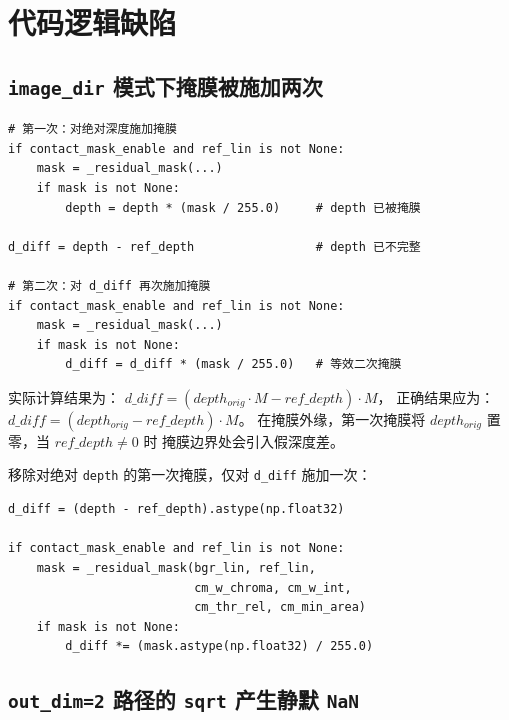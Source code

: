 \section{代码逻辑缺陷}
\label{sec:bugs}

\subsection{\texttt{image\_dir} 模式下掩膜被施加两次}
\label{subsec:double_mask}

\begin{lstlisting}[caption={接触掩膜被连续施加两次（reconstruct.py）}]
# 第一次：对绝对深度施加掩膜
if contact_mask_enable and ref_lin is not None:
    mask = _residual_mask(...)
    if mask is not None:
        depth = depth * (mask / 255.0)     # depth 已被掩膜

d_diff = depth - ref_depth                 # depth 已不完整

# 第二次：对 d_diff 再次施加掩膜
if contact_mask_enable and ref_lin is not None:
    mask = _residual_mask(...)
    if mask is not None:
        d_diff = d_diff * (mask / 255.0)   # 等效二次掩膜
\end{lstlisting}

\begin{bugbox}
实际计算结果为：
$d\_diff = (depth_{orig} \cdot M - ref\_depth) \cdot M$，
正确结果应为：
$d\_diff = (depth_{orig} - ref\_depth) \cdot M$。
在掩膜外缘，第一次掩膜将 $depth_{orig}$ 置零，当 $ref\_depth \neq 0$ 时
掩膜边界处会引入假深度差。
\end{bugbox}

\begin{fixbox}
移除对绝对 \texttt{depth} 的第一次掩膜，仅对 \texttt{d\_diff} 施加一次：

\begin{lstlisting}
d_diff = (depth - ref_depth).astype(np.float32)

if contact_mask_enable and ref_lin is not None:
    mask = _residual_mask(bgr_lin, ref_lin,
                          cm_w_chroma, cm_w_int,
                          cm_thr_rel, cm_min_area)
    if mask is not None:
        d_diff *= (mask.astype(np.float32) / 255.0)
\end{lstlisting}
\end{fixbox}

\subsection{\texttt{out\_dim=2} 路径的 \texttt{sqrt} 产生静默 \texttt{NaN}}
\label{subsec:sqrt_nan}

